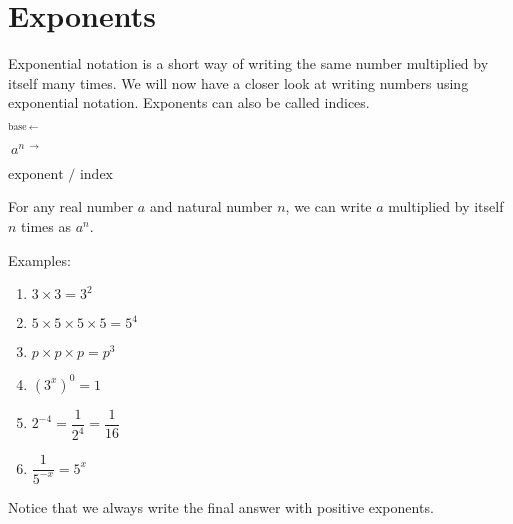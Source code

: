 \chapter{Exponents}
\setcounter{figure}{1}
\setcounter{subfigure}{1}
Exponential notation is a short way of writing the same number multiplied by
itself many times.  We will now have a closer look at writing numbers using exponential notation. Exponents can also be called indices.

 \begin{Large}
\begin{center}
$ _{\mbox{base}~\leftarrow} $\begin{Large} $ ~a^{n~\rightarrow~}$ \end{Large}$\mbox{exponent / index} $
\end{center}
 \end{Large}

For any real number $a$ and natural number $n$, we can write $a$ multiplied by itself $n$ times as $a^n$.

 

Examples:
\begin{enumerate}[itemsep=5pt, label=\textbf{\arabic*.}]
\item $3 \times 3 = 3^2$
\item $5 \times 5 \times 5 \times 5 = 5^4 $
\item $p \times p \times p = p^3$
\item $(3^x)^0 = 1$
\item $ 2^{-4} = \dfrac{1}{2^4} = \dfrac{1}{16}$
\item $ \dfrac{1}{5^{-x}} = 5^x$
\end{enumerate}

Notice that we always write the final answer with positive exponents.
\par
{}

